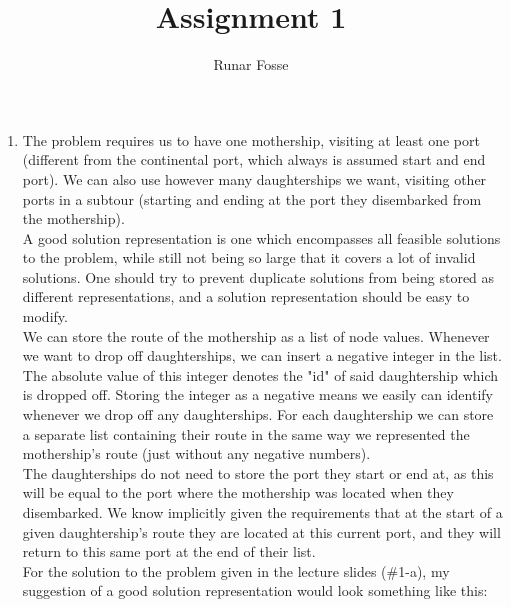 \documentclass{article}
\title{\vspace{-2.0cm} Assignment 1}
\author{Runar Fosse}
\date{}
\begin{document}
\maketitle

\begin{enumerate}[label=(\alph*)]
    \item The problem requires us to have one mothership, visiting at least one port (different from the continental port, which always is assumed start and end port). We can also use however many daughterships we want, visiting other ports in a subtour (starting and ending at the port they disembarked from the mothership).
    \\[10pt]
    A good solution representation is one which encompasses all feasible solutions to the problem, while still not being so large that it covers a lot of invalid solutions. One should try to prevent duplicate solutions from being stored as different representations, and a solution representation should be easy to modify.
    \\[10pt]
    We can store the route of the mothership as a list of node values. Whenever we want to drop off daughterships, we can insert a negative integer in the list. The absolute value of this integer denotes the "id" of said daughtership which is dropped off. Storing the integer as a negative means we easily can identify whenever we drop off any daughterships. For each daughtership we can store a separate list containing their route in the same way we represented the mothership's route (just without any negative numbers).
    \\[10pt]
    The daughterships do not need to store the port they start or end at, as this will be equal to the port where the mothership was located when they disembarked. We know implicitly given the requirements that at the start of a given daughtership's route they are located at this current port, and they will return to this same port at the end of their list.
    \\[10pt]
    For the solution to the problem given in the lecture slides (\#1-a), my suggestion of a good solution representation would look something like this:
    \\[30pt]
    
\end{enumerate}
\end{document}
